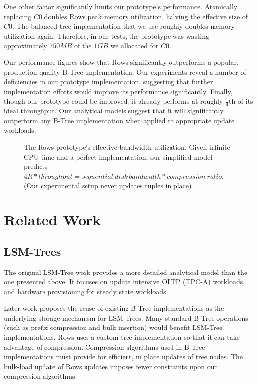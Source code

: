 \documentclass{sig-alternate-sigmod08}
\newcommand{\rows}{Rows\xspace}
\begin{document}
One other factor significantly limits our prototype's performance.
Atomically replacing $C0$ doubles \rows peak memory utilization,
halving the effective size of $C0$.  The balanced tree implementation
that we use roughly doubles memory utilization again.  Therefore, in
our tests, the prototype was wasting approximately $750MB$ of the
$1GB$ we allocated for $C0$.

Our performance figures show that \rows significantly outperforms a
popular, production quality B-Tree implementation.  Our experiments
reveal a number of deficiencies in our prototype implementation,
suggesting that further implementation efforts would improve its
performance significantly.  Finally, though our prototype could be
improved, it already performs at roughly $\frac{1}{4}$th of its ideal
throughput.  Our analytical models suggest that it will significantly
outperform any B-Tree implementation when applied to appropriate
update workloads.

\begin{figure}
\centering
{}
\caption{The \rows prototype's effective bandwidth utilization.  Given
  infinite CPU time and a perfect implementation, our simplified model predicts $4R * throughput = sequential~disk~bandwidth *
  compression~ratio$.  (Our experimental setup never updates tuples in
  place)}
\label{fig:4R}
\end{figure}

\section{Related Work}

\subsection{LSM-Trees}

The original LSM-Tree work\cite{lsm} provides a more detailed
analytical model than the one presented above.  It focuses on update
intensive OLTP (TPC-A) workloads, and hardware provisioning for steady
state workloads.

Later work proposes the reuse of existing B-Tree implementations as
the underlying storage mechanism for LSM-Trees\cite{cidrPartitionedBTree}.  Many
standard B-Tree operations (such as prefix compression and bulk insertion)
would benefit LSM-Tree implementations.  \rows uses a custom tree
implementation so that it can take advantage of compression.
Compression algorithms used in B-Tree implementations must provide for
efficient, in place updates of tree nodes.  The bulk-load update of
\rows updates imposes fewer constraints upon our compression
algorithms.
\end{document}
